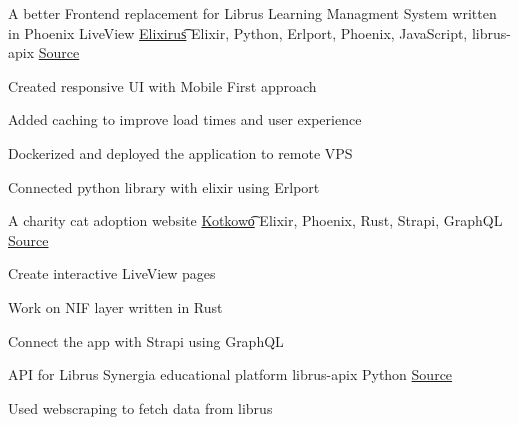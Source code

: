 

\begin{cventries}

  \vspace{-2.25mm}
  \cventry
    {A better Frontend replacement for Librus Learning Managment System written in Phoenix LiveView} %
    {\href{https://elixirus.rustysnek.xyz}{{Elixirus}\t{\faLink\acvHeaderIconSep}}} %
    {Elixir, Python, Erlport, Phoenix, JavaScript, librus-apix} %
    {\href{https://github.com/rustysnek/elixirus}{\faGithubSquare\acvHeaderIconSep Source}} %
    {
      \begin{cvitems} %
        \item {Created responsive UI with Mobile First approach}  
        \item {Added caching to improve load times and user experience}  
        \item {Dockerized and deployed the application to remote VPS}
        \item {Connected python library with elixir using Erlport}
      \end{cvitems}
    } %
  \cventry
    { A charity cat adoption website } %
    {\href{https://kotkowo.ravensiris.xyz}{{Kotkowo}\t{\faLink\acvHeaderIconSep}}} %
    {Elixir, Phoenix, Rust, Strapi, GraphQL} %
    {\href{https://github.com/kotkowo/kotkowo}{\faGithubSquare\acvHeaderIconSep Source}} %
    {
      \begin{cvitems} %
        \item {Create interactive LiveView pages}
        \item {Work on NIF layer written in Rust}
        \item {Connect the app with Strapi using GraphQL}
      \end{cvitems}
    } %
  \vspace{3.00mm}
  \cventry
    {API for Librus Synergia educational platform} %
    {librus-apix} %
    {Python} %
    {\href{https://github.com/rustysnek/librus-apix}{\faGithubSquare\acvHeaderIconSep Source}} %
    {
      \begin{cvitems} %
        \item {Used webscraping to fetch data from librus}
      \end{cvitems}
    } %


\end{cventries}
